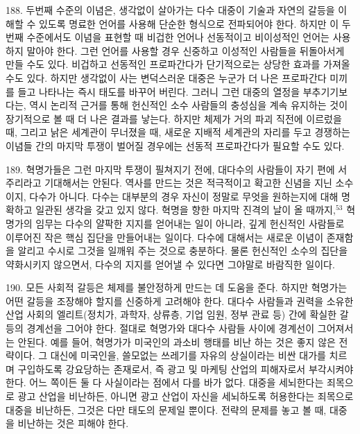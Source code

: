 \documentclass[11pt,a4paper]{article}
\begin{document}
\begin{multicols}{2}
188. 두번째 수준의 이념은, 생각없이 살아가는 다수 대중이 기술과 자연의 갈등을 이해할 수 있도록  명료한 언어를 사용해 단순한 형식으로 전파되어야 한다. 하지만 이 두번째 수준에서도 이념을 표현할 때  비겁한 언어나 선동적이고 비이성적인 언어는 사용하지 말아야 한다. 그런 언어를 사용할 경우 신중하고  이성적인 사람들을 뒤돌아서게 만들 수도 있다. 비겁하고 선동적인 프로파간다가 단기적으로는 상당한  효과를 가져올 수도 있다. 하지만 생각없이 사는 변덕스러운 대중은 누군가 더 나은 프로파간다 미끼를  들고 나타나는 즉시 태도를 바꾸어 버린다. 그러니 그런 대중의 열정을 부추기기보다는, 역시 논리적  근거를 통해 헌신적인 소수 사람들의 충성심을 계속 유지하는 것이 장기적으로 볼 때 더 나은 결과를  낳는다. 하지만 체제가 거의 파괴 직전에 이르렀을 때, 그리고 낡은 세계관이 무너졌을 때, 새로운 지배적  세계관의 자리를 두고 경쟁하는 이념들 간의 마지막 투쟁이 벌어질 경우에는 선동적 프로파간다가 필요할 수도 있다.  


189. 혁명가들은 그런 마지막 투쟁이 필쳐지기 전에, 대다수의 사람들이 자기 편에 서주리라고  기대해서는 안된다. 역사를 만드는 것은 적극적이고 확고한 신념을 지닌 소수이지, 다수가 아니다. 다수는 대부분의 경우 자신이 정말로 무엇을 원하는지에 대해 명확하고 일관된 생각을 갖고 있지 않다. 혁명을  향한 마지막 진격의 날이 올 때까지,\hyperlink{53}{$^{53}$} 혁명가의 임무는 다수의 얄팍한 지지를 얻어내는 일이 아니라, 깊게 헌신적인 사람들로 이루어진 작은 핵심 집단을 만들어내는 일이다. 다수에 대해서는 새로운 이념이  존재함을 알리고 수시로 그것을 일깨워 주는 것으로 충분하다. 물론 헌신적인 소수의 집단을 약화시키지  않으면서, 다수의 지지를 얻어낼 수 있다면 그야말로 바람직한 일이다.  


190. 모든 사회적 갈등은 체제를 불안정하게 만드는 데 도움을 준다. 하지만 혁명가는 어떤 갈등을  조장해야 할지를 신중하게 고려해야 한다. 대다수 사람들과 권력을 소유한 산업 사회의 엘리트(정치가,  과학자, 상류층, 기업 임원, 정부 관료 등) 간에 확실한 갈등의 경계선을 그어야 한다. 절대로 혁명가와  대다수 사람들 사이에 경계선이 그어져서는 안된다. 예를 들어, 혁명가가 미국인의 과소비 행태를 비난  하는 것은 좋지 않은 전략이다. 그 대신에 미국인을, 쓸모없는 쓰레기를 자유의 상실이라는 비싼 대가를  치르며 구입하도록 강요당하는 존재로서, 즉 광고 및 마케팅 산업의 피해자로서 부각시켜야 한다. 어느  쪽이든 둘 다 사실이라는 점에서 다를 바가 없다. 대중을 세뇌한다는 죄목으로 광고 산업을 비난하든,  아니면 광고 산업이 자신을 세뇌하도록 허용한다는 죄목으로 대중을 비난하든, 그것은 다만 태도의  문제일 뿐이다. 전략의 문제를 놓고 볼 때, 대중을 비난하는 것은 피해야 한다.  



\end{multicols}
\end{document}

